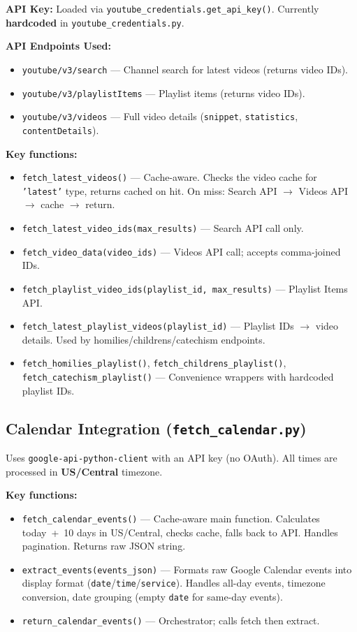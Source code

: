 \documentclass[12pt]{article}
\begin{document}
\textbf{API Key:} Loaded via \texttt{youtube\_credentials.get\_api\_key()}. Currently \textbf{hardcoded} in \texttt{youtube\_credentials.py}.

\textbf{API Endpoints Used:}
\begin{itemize}
    \item \texttt{youtube/v3/search} --- Channel search for latest videos (returns video IDs).
    \item \texttt{youtube/v3/playlistItems} --- Playlist items (returns video IDs).
    \item \texttt{youtube/v3/videos} --- Full video details (\texttt{snippet}, \texttt{statistics}, \texttt{contentDetails}).
\end{itemize}

\textbf{Key functions:}
\begin{itemize}
    \item \texttt{fetch\_latest\_videos()} --- Cache-aware. Checks the video cache for \texttt{'latest'} type, returns cached on hit. On miss: Search API $\rightarrow$ Videos API $\rightarrow$ cache $\rightarrow$ return.
    \item \texttt{fetch\_latest\_video\_ids(max\_results)} --- Search API call only.
    \item \texttt{fetch\_video\_data(video\_ids)} --- Videos API call; accepts comma-joined IDs.
    \item \texttt{fetch\_playlist\_video\_ids(playlist\_id, max\_results)} --- Playlist Items API.
    \item \texttt{fetch\_latest\_playlist\_videos(playlist\_id)} --- Playlist IDs $\rightarrow$ video details. Used by homilies/childrens/catechism endpoints.
    \item \texttt{fetch\_homilies\_playlist()}, \texttt{fetch\_childrens\_playlist()},\\ \texttt{fetch\_catechism\_playlist()} --- Convenience wrappers with hardcoded playlist IDs.
\end{itemize}

\subsection{Calendar Integration (\texttt{fetch\_calendar.py})}

Uses \texttt{google-api-python-client} with an API key (no OAuth). All times are processed in \textbf{US/Central} timezone.

\textbf{Key functions:}
\begin{itemize}
    \item \texttt{fetch\_calendar\_events()} --- Cache-aware main function. Calculates today~+~10 days in US/Central, checks cache, falls back to API. Handles pagination. Returns raw JSON string.
    \item \texttt{extract\_events(events\_json)} --- Formats raw Google Calendar events into display format (\texttt{date}/\texttt{time}/\texttt{service}). Handles all-day events, timezone conversion, date grouping (empty \texttt{date} for same-day events).
    \item \texttt{return\_calendar\_events()} --- Orchestrator; calls fetch then extract.
\end{itemize}
\end{document}
